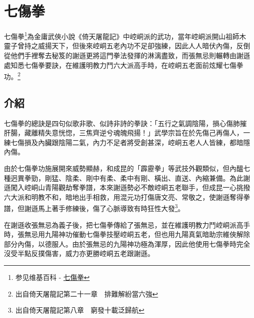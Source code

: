 \chapter{七傷拳}
七傷拳\footnote{参见维基百科 - \href{http://zh.wikipedia.org/wiki/\%E4\%B8\%83\%E5\%82\%B7\%E6\%8B\%B3}{七傷拳}}為金庸武俠小說《倚天屠龍記》中崆峒派的武功，當年崆峒派開山祖師木靈子曾持之威揚天下，但後來崆峒五老內功不足卻強練，因此人人暗伏內傷，反倒從他們手裡奪去秘笈的謝遜更將這門拳法發揮的淋漓盡致，而張無忌則輾轉由謝遜處知悉七傷拳要訣，在維護明教力鬥六大派高手時，在崆峒五老面前炫耀七傷拳功。\footnote{出自倚天屠龍記第二十一章　排難解紛當六強}

\section{介紹}

七傷拳的總訣是四句似歌非歌、似詩非詩的拳訣：「五行之氣調陰陽，損心傷肺摧肝腸，藏離精失意恍惚，三焦齊逆兮魂魄飛揚！」武學宗旨在於先傷己再傷人，一練七傷損及內臟跟陰陽二氣，內力不足者將受創甚深，崆峒五老人人皆練，都暗隱內傷。

由於七傷拳功施展開來威勢顯赫，和成昆的「霹靂拳」等武技外觀類似，但內醞七種迥異拳勁，剛猛、陰柔、剛中有柔、柔中有剛、橫出、直送、內縮兼備。為此謝遜闖入崆峒山青陽觀劫奪拳譜，本來謝遜勢必不敵崆峒五老聯手，但成昆一心挑撥六大派和明教不和，暗地出手相救，用混元功打傷唐文亮、常敬之，使謝遜奪得拳譜，但謝遜馬上著手修練後，傷了心脈導致有時狂性大發\footnote{出自倚天屠龍記第八章　窮發十載泛歸航}。

在謝遜收張無忌為義子後，把七傷拳傳給了張無忌，並在維護明教力鬥崆峒派高手時，張無忌用九陽神功催動七傷拳技壓崆峒五老，但也用九陽真氣暗助宗維俠解除部分內傷，以德服人。由於張無忌的九陽神功極為渾厚，因此他使用七傷拳時完全沒受半點反撲傷害，威力亦更勝崆峒五老跟謝遜。

